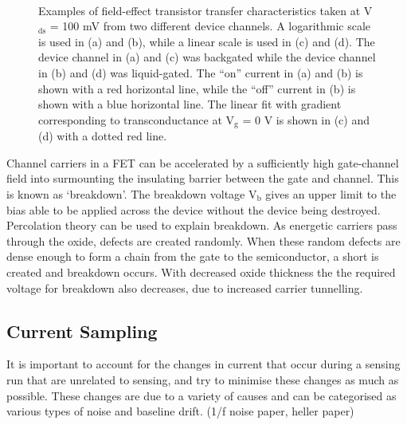 \documentclass[
  a4paper,
]{scrbook}
\begin{document}
\begin{figure}
\begin{minipage}[t]{0.45\linewidth}
{{}

}

\end{minipage}%
%
\begin{minipage}[t]{0.01\linewidth}

{\centering 

~

}

\end{minipage}%

\caption{\label{fig-gating-transfer}Examples of field-effect transistor
transfer characteristics taken at V\(_\textrm{ds}\) = 100 mV from two
different device channels. A logarithmic scale is used in (a) and (b),
while a linear scale is used in (c) and (d). The device channel in (a)
and (c) was backgated while the device channel in (b) and (d) was
liquid-gated. The ``on'' current in (a) and (b) is shown with a red
horizontal line, while the ``off'' current in (b) is shown with a blue
horizontal line. The linear fit with gradient corresponding to
transconductance at V\(_\textrm{g}\) = 0 V is shown in (c) and (d) with
a dotted red line.}

\end{figure}

Channel carriers in a FET can be accelerated by a sufficiently high
gate-channel field into surmounting the insulating barrier between the
gate and channel. This is known as `breakdown'. The breakdown voltage
V\(_\textrm{b}\) gives an upper limit to the bias able to be applied
across the device without the device being destroyed. Percolation theory
can be used to explain breakdown. As energetic carriers pass through the
oxide, defects are created randomly. When these random defects are dense
enough to form a chain from the gate to the semiconductor, a short is
created and breakdown occurs. With decreased oxide thickness the the
required voltage for breakdown also decreases, due to increased carrier
tunnelling.

\hypertarget{current-sampling}{%
\subsection{Current Sampling}\label{current-sampling}}

It is important to account for the changes in current that occur during
a sensing run that are unrelated to sensing, and try to minimise these
changes as much as possible. These changes are due to a variety of
causes and can be categorised as various types of noise and baseline
drift. (1/f noise paper, heller paper)
\end{document}
